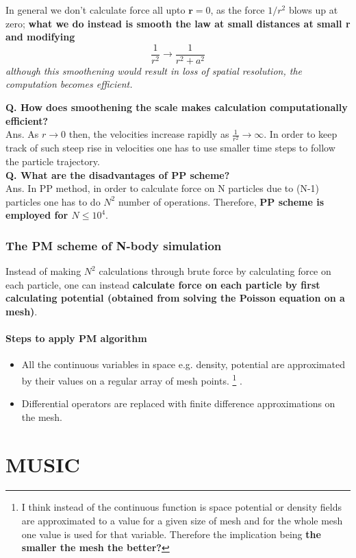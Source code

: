 \documentclass[12pt]{report}
\newcommand{\mbf}[1]{\mathbf{#1}}
\newcommand{\tbf}[1]{\textbf{#1}}
\newcommand{\tit}[1]{\textit{#1}}
\newcommand{\fn}[1]{\footnote{#1}}
\newcommand{\cbox}{tcolorbox}
\begin{document}
\begin{\cbox}
In general we don't calculate force all upto $\mbf{r}=0$, as the force $1/r^2$ blows up at zero; \tbf{what we do instead is smooth the law at small distances at small r and modifying }
\begin{equation}
\frac{1}{r^2}\rightarrow \frac{1}{r^2+a^2}
\end{equation}
\tit{although this smoothening would result in loss of spatial resolution, the computation becomes efficient.}
\end{\cbox}
\medskip
\tbf{Q. How does smoothening the scale makes calculation computationally efficient?}\\

Ans. As $r \rightarrow 0$ then, the velocities increase rapidly as $\frac{1}{r^2}\rightarrow \infty$. In order to keep track of such steep rise in velocities one has to use smaller time steps to follow the particle trajectory.\\

\tbf{Q. What are the disadvantages of PP scheme?}\\

Ans. In PP method, in order to calculate force on N particles due to (N-1) particles one has to do $N^2$
number of operations. Therefore, \tbf{PP scheme is employed for $N\leq 10^4$}.

\subsection{The PM scheme of N-body simulation}

Instead of making $N^2$ calculations through brute force by calculating force on each particle, one can instead \tbf{calculate force on each particle by first calculating potential (obtained from solving the Poisson equation on a mesh)}.
\subsubsection{Steps to apply PM algorithm}
\begin{itemize}
\item All the continuous variables in space e.g. density, potential are approximated by their values on a regular array of mesh points. \fn{ I think instead of the continuous function is space potential or density fields are approximated to a value for a given size of mesh and for the whole mesh one value is used for that variable. Therefore the implication being \tbf{the smaller the mesh the better?} }  .
\item Differential operators are replaced with finite difference approximations on the mesh.

\end{itemize}
 \chapter{MUSIC}
 
\end{document}
